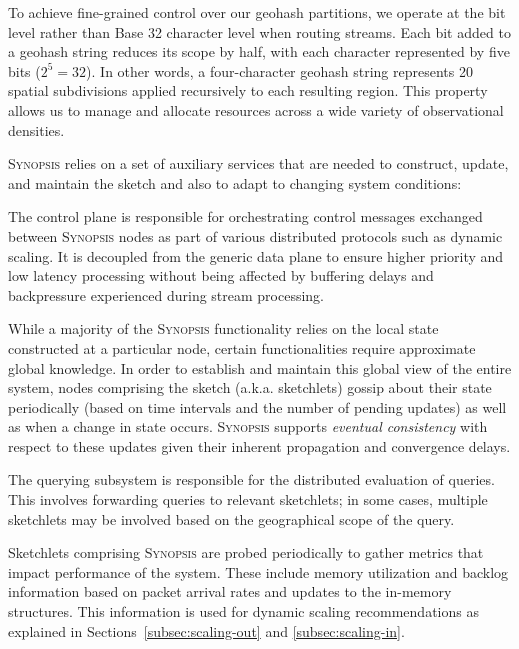 To achieve fine-grained control over our geohash partitions, we operate at the bit level rather than Base 32 character level when routing streams. Each bit added to a geohash string reduces its scope by half, with each character represented by five bits ($2^5 = 32$). In other words, a four-character geohash string represents 20 spatial subdivisions applied recursively to each resulting region. This property allows us to manage and allocate resources across a wide variety of observational densities.

\textsc{Synopsis} relies on a set of auxiliary services that are needed to construct, update, and maintain the sketch and also to adapt to changing system conditions:

\begin{description}[leftmargin=*]
	\item[Control plane:] The control plane is responsible for orchestrating control messages exchanged between \textsc{Synopsis} nodes as part of various distributed protocols such as dynamic scaling.
    It is decoupled from the generic data plane to ensure higher priority and low latency processing without being affected by buffering delays and backpressure experienced during stream processing.

	\item[Gossip subsystem:] While a majority of the \textsc{Synopsis} functionality relies on the local state constructed at a particular node, certain functionalities require approximate global knowledge.
        In order to establish and maintain this global view of the entire system, nodes comprising the sketch (a.k.a. sketchlets) gossip about their state periodically (based on time intervals and the number of pending updates) as well as when a change in state occurs.
    \textsc{Synopsis} supports \emph{eventual consistency} with respect to these updates given their inherent propagation and convergence delays.

	\item[Querying subsystem:] The querying subsystem is responsible for the distributed evaluation of queries.
    This involves forwarding queries to relevant sketchlets; in some cases, multiple sketchlets may be involved based on the geographical scope of the query.

    \item[Monitoring subsystem:] Sketchlets comprising \textsc{Synopsis} are probed periodically to gather metrics that impact performance of the system.
    These include memory utilization and backlog information based on packet arrival rates and updates to the in-memory structures.
    This information is used for dynamic scaling recommendations as explained in Sections~\ref{subsec:scaling-out} and \ref{subsec:scaling-in}.
\end{description}
